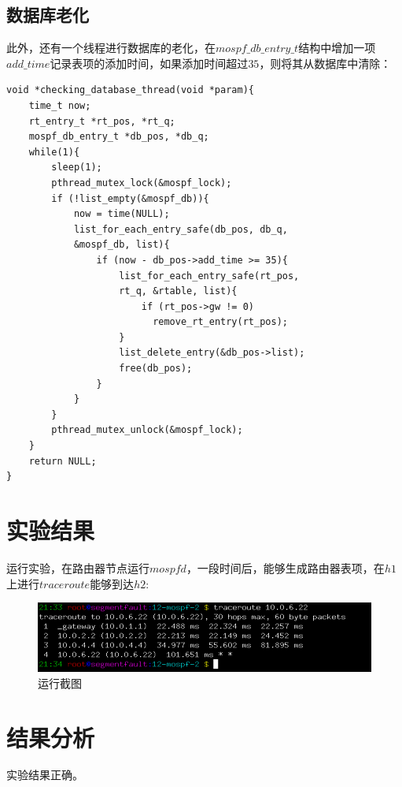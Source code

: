 \documentclass[UTF8,noindent]{ctexart}
\begin{document}
\subsection*{数据库老化}
此外，还有一个线程进行数据库的老化，在$mospf\_db\_entry\_t$结构中增加一项$add\_time$记录表项的添加时间，如果添加时间超过$35$，则将其从数据库中清除：
\begin{lstlisting}
void *checking_database_thread(void *param){
	time_t now;
	rt_entry_t *rt_pos, *rt_q;
	mospf_db_entry_t *db_pos, *db_q;
	while(1){
		sleep(1);
		pthread_mutex_lock(&mospf_lock);
		if (!list_empty(&mospf_db)){
			now = time(NULL);
			list_for_each_entry_safe(db_pos, db_q,
			&mospf_db, list){
				if (now - db_pos->add_time >= 35){
					list_for_each_entry_safe(rt_pos, 
					rt_q, &rtable, list){
						if (rt_pos->gw != 0)
						  remove_rt_entry(rt_pos);
					}
					list_delete_entry(&db_pos->list);
					free(db_pos);
				}
			}
		}
		pthread_mutex_unlock(&mospf_lock);
	}
	return NULL;
}
\end{lstlisting}

\section*{{实验结果}}
运行实验，在路由器节点运行$mospfd$，一段时间后，能够生成路由器表项，在$h1$上进行$traceroute$能够到达$h2$:
\begin{figure}[H]
  \centering
  \includegraphics[scale = 0.4]{1.png}
  \caption{运行截图}
\end{figure}


\section*{{结果分析}}
实验结果正确。
\end{document}
